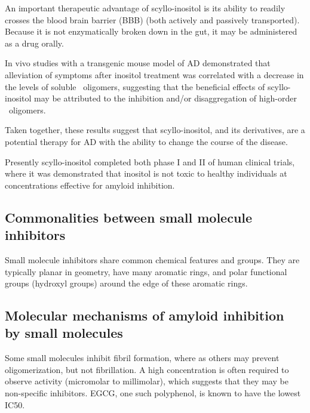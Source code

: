 An important therapeutic advantage of scyllo-inositol is its ability to readily crosses the bloodbrain barrier (BBB) (both actively and passively transported). Because it is not enzymatically broken down in the gut, it may be administered as a drug orally. 
		
In vivo studies with a transgenic mouse model of AD demonstrated that alleviation of symptoms after inositol treatment was correlated with a decrease in the levels of soluble \abeta\ oligomers, suggesting that the beneficial effects of scyllo-inositol may be attributed to the inhibition and/or disaggregation of high-order \abeta\ oligomers.\cite{McLaurin:2006eb}

Taken together, these results suggest that scyllo-inositol, and its derivatives, are a potential therapy for AD with the ability to change the course of the disease.\cite{Nitz:2008jl,Sun:2008ko}

Presently scyllo-inositol completed both phase I and II of human clinical trials, where it was demonstrated that inositol is not toxic to healthy individuals at concentrations effective for amyloid inhibition.

\subsection{Commonalities between small molecule inhibitors}
Small molecule inhibitors share common chemical features and groups.  They are typically planar in geometry, have many aromatic rings, and polar functional groups (hydroxyl groups) around the edge of these aromatic rings.



\subsection{Molecular mechanisms of amyloid inhibition 
	            \\ by small molecules}
Some small molecules inhibit fibril formation, where as others may prevent oligomerization, but not fibrillation. A high concentration is often required to observe activity (micromolar to millimolar), which suggests that they may be non-specific inhibitors. EGCG, one such polyphenol, is known to have the lowest IC50.
      
